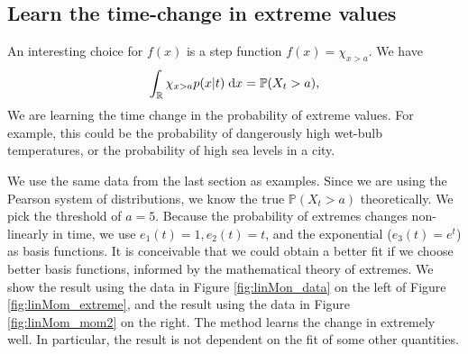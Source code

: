 \documentclass[11pt,letterpaper]{article}
\begin{document}
\subsection{Learn the time-change in extreme values}\label{sec:numerical_extreme}
An interesting choice for $f(x)$ is a step function $f(x) = \chi_{x > a}$. We have
\begin{align}
    \int_\mathbb{R} \chi_{x > a}p(x|t)\;\mathrm{d} x = \mathbb{P}(X_t>a),
\end{align}
We are learning the time change in the probability of extreme values. For example, this could be the probability of dangerously high wet-bulb temperatures, or the probability of high sea levels in a city.

We use the same data from the last section as examples. Since we are using the Pearson system of distributions, we know the true $\mathbb{P}(X_t>a)$ theoretically. We pick the threshold of $a = 5$. Because the probability of extremes changes non-linearly in time, we use $e_1(t) = 1, e_2(t) = t$, and the exponential ($e_3(t) = e^t$) as basis functions. It is conceivable that we could obtain a better fit if we choose better basis functions, informed by the mathematical theory of extremes. We show the result using the data in Figure \ref{fig:linMon_data} on the left of Figure \ref{fig:linMom_extreme}, and the result using the data in Figure \ref{fig:linMom_mom2} on the right. The method learns the change in extremely well. In particular, the result is not dependent on the fit of some other quantities. 
\end{document}
